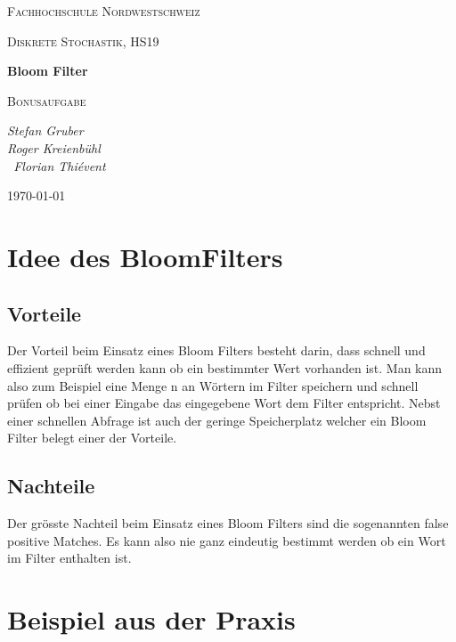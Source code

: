 \documentclass[12pt,a4paper]{report}
\begin{document}
\begin{titlepage}
	\centering
	\qquad
	\par\vspace{1cm}
	{\scshape\LARGE Fachhochschule Nordwestschweiz \par}
	{\scshape\Large Diskrete Stochastik, HS19\par}
	\vspace{5cm}
	{\huge\bfseries Bloom Filter\par}
	{\scshape\Large Bonusaufgabe\par}
	\vspace{2cm}
	{\Large\itshape  Stefan Gruber \\ Roger Kreienbühl \\ Florian Thiévent \par}
	\vfill
	{\large \today\par}
\end{titlepage}

\tableofcontents
\newpage

\chapter{Idee des BloomFilters}\label{ch:idee-des-bloomfilters}
\section{Vorteile}\label{sec:vorteile}
Der Vorteil beim Einsatz eines Bloom Filters besteht darin, dass schnell und effizient geprüft werden kann ob ein bestimmter Wert vorhanden ist. Man kann also zum Beispiel eine Menge n an Wörtern im Filter speichern und schnell prüfen ob bei einer Eingabe das eingegebene Wort dem Filter entspricht. Nebst einer schnellen Abfrage ist auch der geringe Speicherplatz welcher ein Bloom Filter belegt einer der Vorteile.
\section{Nachteile}\label{sec:nachteile}
Der grösste Nachteil beim Einsatz eines Bloom Filters sind die sogenannten false positive Matches. Es kann also nie ganz eindeutig bestimmt werden ob ein Wort im Filter enthalten ist.

\chapter{Beispiel aus der Praxis}\label{ch:beispiel-aus-der-praxis}
\end{document}
